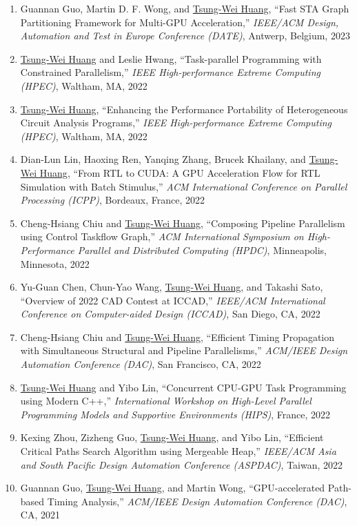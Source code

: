 \documentclass[A4,11pt]{article}
\begin{document}
\begin{enumerate}
    \item Guannan Guo, Martin D. F. Wong, and \underline{Tsung-Wei Huang}, ``Fast STA Graph Partitioning Framework for Multi-GPU Acceleration,'' \textit{IEEE/ACM Design, Automation and Test in Europe Conference (DATE)}, Antwerp, Belgium, 2023
    \item \underline{Tsung-Wei Huang} and Leslie Hwang, ``Task-parallel Programming with Constrained Parallelism,'' \textit{IEEE High-performance Extreme Computing (HPEC)}, Waltham, MA, 2022
    \item \underline{Tsung-Wei Huang}, ``Enhancing the Performance Portability of Heterogeneous Circuit Analysis Programs,'' \textit{IEEE High-performance Extreme Computing (HPEC)}, Waltham, MA, 2022
    \item Dian-Lun Lin, Haoxing Ren, Yanqing Zhang, Brucek Khailany, and \underline{Tsung-Wei Huang}, ``From RTL to CUDA: A GPU Acceleration Flow for RTL Simulation with Batch Stimulus,'' \textit{ACM International Conference on Parallel Processing (ICPP)}, Bordeaux, France, 2022
    \item Cheng-Hsiang Chiu and \underline{Tsung-Wei Huang}, ``Composing Pipeline Parallelism using Control Taskflow Graph,'' \textit{ACM International Symposium on High-Performance Parallel and Distributed Computing (HPDC)}, Minneapolis, Minnesota, 2022
    \item Yu-Guan Chen, Chun-Yao Wang, \underline{Tsung-Wei Huang}, and Takashi Sato, ``Overview of 2022 CAD Contest at ICCAD,'' \textit{IEEE/ACM International Conference on Computer-aided Design (ICCAD)}, San Diego, CA, 2022
    \item Cheng-Hsiang Chiu and \underline{Tsung-Wei Huang}, ``Efficient Timing Propagation with Simultaneous Structural and Pipeline Parallelisms,'' \textit{ACM/IEEE Design Automation Conference (DAC)}, San Francisco, CA, 2022 
    \item \underline{Tsung-Wei Huang} and Yibo Lin, ``Concurrent CPU-GPU Task Programming using Modern C++,'' \textit{International Workshop on High-Level Parallel Programming Models and Supportive Environments (HIPS)}, France, 2022
    \item Kexing Zhou, Zizheng Guo, \underline{Tsung-Wei Huang}, and Yibo Lin, ``Efficient Critical Paths Search Algorithm using Mergeable Heap,'' \textit{IEEE/ACM Asia and South Pacific Design Automation Conference (ASPDAC)}, Taiwan, 2022
    \item Guannan Guo, \underline{Tsung-Wei Huang}, and Martin Wong, ``GPU-accelerated Path-based Timing Analysis,'' \textit{ACM/IEEE Design Automation Conference (DAC)}, CA, 2021

\end{enumerate}
\end{document}
